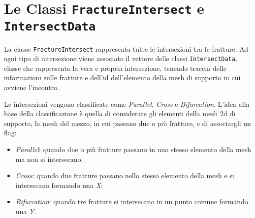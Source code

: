  \section{Le Classi \texttt{FractureIntersect} e \texttt{IntersectData}}

La classe \texttt{FractureIntersect} rappresenta tutte le intersezioni tra le fratture. Ad ogni tipo di intersezione viene associato il vettore delle classi \texttt{IntersectData}, classe che rappresenta la vera e propria intersezione, tenendo traccia delle informazioni sulle fratture e dell'id dell'elemento della mesh di supporto in cui avviene l'incontro.
\par Le intersezioni vengono classificate come \textit{Parallel}, \textit{Cross} e \textit{Bifurcation}.  L'idea alla base della classificazione è quella di considerare gli elementi della mesh 2d di supporto, la mesh del mezzo, in cui passano due o più fratture, e di associargli un flag:
\begin{itemize}
\item \textit{Parallel}: quando due o più fratture passano in uno stesso elemento della mesh ma non si intersecano;
\item \textit{Cross}: quando due fratture passano nello stesso elemento della mesh e si intersecano formando una \textit{X};
\item \textit{Bifurcation}: quando tre fratture si intersecano in un punto comune formando una \textit{Y}.
\end{itemize}

